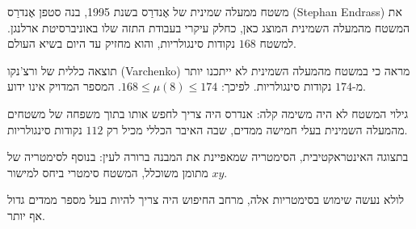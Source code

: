 \begin{surferPage}{משטח ממעלה שמינית של אֶנדרַס}
     בשנת 1995, בנה סטפן אֶנדרַס
      \textenglish{(Stephan Endrass)}
       את המשטח מהמעלה השמינית המוצג כאן, כחלק 
    עיקרי בעבודת התזה שלו באוניברסיטת ארלנגן.
    למשטח $168$ נקודות סינגולריות, והוא מחזיק עד היום בשיא
    העולם. 
  
     תוצאה כללית של ורצ'נקו (Varchenko) מראה כי במשטח מהמעלה השמינית לא ייתכנו יותר
    מ-$174$ נקודות סינגולריות.
    לפיכך: $168 \le \mu(8) \le 174$. 
    המספר המדויק אינו ידוע.

     גילוי המשטח לא היה משימה קלה: אנדרס היה צריך לחפש אותו
    בתוך משפחה של משטחים מהמעלה השמינית בעלי חמישה ממדים, שבה האיבר הכללי
    מכיל רק $112$ נקודות סינגולריות.

    בתצוגה האינטראקטיבית, הסימטריה שמאפיינת את המבנה ברורה לעין: 
    בנוסף לסימטריה של מתומן משוכלל, המשטח סימטרי
    ביחס למישור $xy$.

    לולא נעשה שימוש בסימטריות אלה, מרחב החיפוש היה צריך להיות בעל
    מספר ממדים גדול אף יותר.
\end{surferPage}
